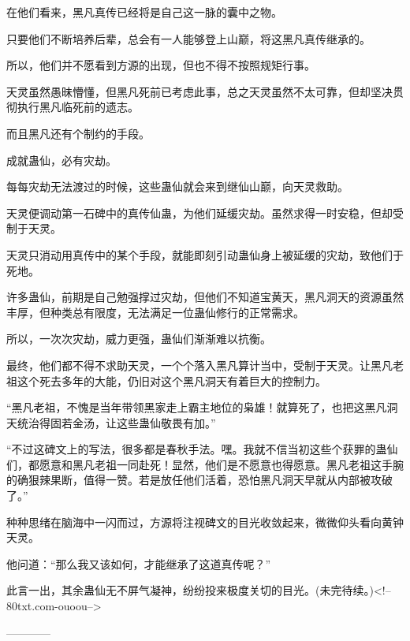 \begin{this_body}
在他们看来，黑凡真传已经将是自己这一脉的囊中之物。

只要他们不断培养后辈，总会有一人能够登上山巅，将这黑凡真传继承的。

所以，他们并不愿看到方源的出现，但也不得不按照规矩行事。

天灵虽然愚昧懵懂，但黑凡死前已考虑此事，总之天灵虽然不太可靠，但却坚决贯彻执行黑凡临死前的遗志。

而且黑凡还有个制约的手段。

成就蛊仙，必有灾劫。

每每灾劫无法渡过的时候，这些蛊仙就会来到继仙山巅，向天灵救助。

天灵便调动第一石碑中的真传仙蛊，为他们延缓灾劫。虽然求得一时安稳，但却受制于天灵。

天灵只消动用真传中的某个手段，就能即刻引动蛊仙身上被延缓的灾劫，致他们于死地。

许多蛊仙，前期是自己勉强撑过灾劫，但他们不知道宝黄天，黑凡洞天的资源虽然丰厚，但种类总有限度，无法满足一位蛊仙修行的正常需求。

所以，一次次灾劫，威力更强，蛊仙们渐渐难以抗衡。

最终，他们都不得不求助天灵，一个个落入黑凡算计当中，受制于天灵。让黑凡老祖这个死去多年的大能，仍旧对这个黑凡洞天有着巨大的控制力。

“黑凡老祖，不愧是当年带领黑家走上霸主地位的枭雄！就算死了，也把这黑凡洞天统治得固若金汤，让这些蛊仙敬畏有加。”

“不过这碑文上的写法，很多都是春秋手法。嘿。我就不信当初这些个获罪的蛊仙们，都愿意和黑凡老祖一同赴死！显然，他们是不愿意也得愿意。黑凡老祖这手腕的确狠辣果断，值得一赞。若是放任他们活着，恐怕黑凡洞天早就从内部被攻破了。”

种种思绪在脑海中一闪而过，方源将注视碑文的目光收敛起来，微微仰头看向黄钟天灵。

他问道：“那么我又该如何，才能继承了这道真传呢？”

此言一出，其余蛊仙无不屏气凝神，纷纷投来极度关切的目光。(未完待续。)<!--80txt.com-ouoou-->

------------

\end{this_body}

